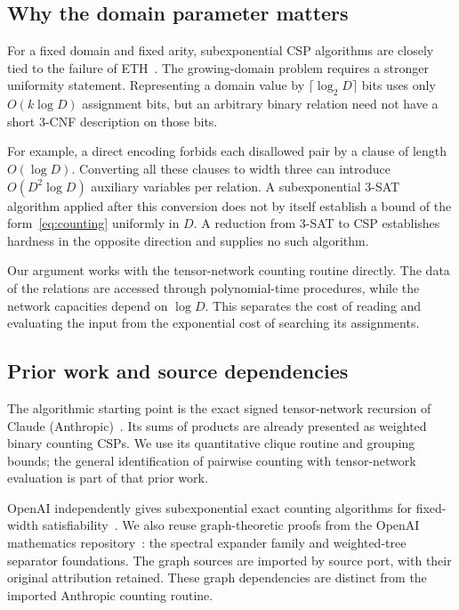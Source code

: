 \documentclass[11pt,reqno]{amsart}
\numberwithin{equation}{section}
\theoremstyle{definition}
\theoremstyle{remark}
\begin{document}
\subsection{Why the domain parameter matters}\label{sec:uniformity}

For a fixed domain and fixed arity, subexponential CSP algorithms are closely tied to the failure of ETH~\cite{KS13}. The growing-domain problem requires a stronger uniformity statement. Representing a domain value by $\lceil\log_2D\rceil$ bits uses only $O(k\log D)$ assignment bits, but an arbitrary binary relation need not have a short $3$-CNF description on those bits.

For example, a direct encoding forbids each disallowed pair by a clause of length $O(\log D)$. Converting all these clauses to width three can introduce $O(D^2\log D)$ auxiliary variables per relation. A subexponential $3$-SAT algorithm applied after this conversion does not by itself establish a bound of the form~\eqref{eq:counting} uniformly in $D$. A reduction from $3$-SAT to CSP establishes hardness in the opposite direction and supplies no such algorithm.

Our argument works with the tensor-network counting routine directly. The data of the relations are accessed through polynomial-time procedures, while the network capacities depend on $\log D$. This separates the cost of reading and evaluating the input from the exponential cost of searching its assignments.

\subsection{Prior work and source dependencies}\label{sec:prior}

The algorithmic starting point is the exact signed tensor-network recursion of Claude (Anthropic)~\cite{ClaudeETH,AnthropicLean}. Its sums of products are already presented as weighted binary counting CSPs. We use its quantitative clique routine and grouping bounds; the general identification of pairwise counting with tensor-network evaluation is part of that prior work.

OpenAI independently gives subexponential exact counting algorithms for fixed-width satisfiability~\cite{OpenAIETH}. We also reuse graph-theoretic proofs from the OpenAI mathematics repository~\cite{OpenAIGraph}: the spectral expander family and weighted-tree separator foundations. The graph sources are imported by source port, with their original attribution retained. These graph dependencies are distinct from the imported Anthropic counting routine.
\end{document}
